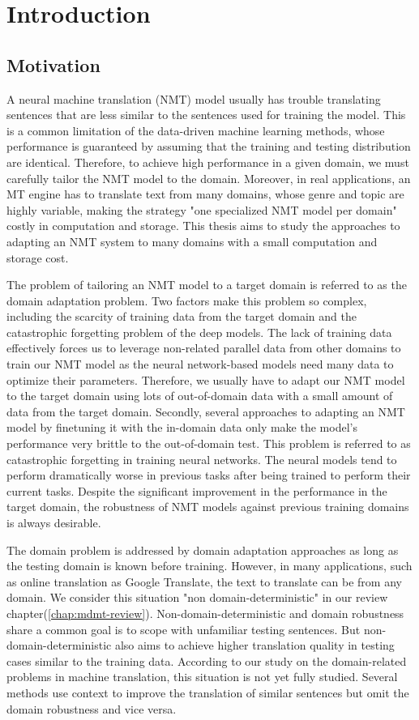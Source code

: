 \chapter{Introduction}
\section{Motivation}
A neural machine translation (NMT) model usually has trouble translating sentences that are less similar to the sentences used for training the model. This is a common limitation of the data-driven machine learning methods, whose performance is guaranteed by assuming that the training and testing distribution are identical. Therefore, to achieve high performance in a given domain, we must carefully tailor the NMT model to the domain. Moreover, in real applications, an MT engine has to translate text from many domains, whose genre and topic are highly variable, making the strategy "one specialized NMT model per domain" costly in computation and storage. This thesis aims to study the approaches to adapting an NMT system to many domains with a small computation and storage cost.

The problem of tailoring an NMT model to a target domain is referred to as the domain adaptation problem. Two factors make this problem so complex, including the scarcity of training data from the target domain and the catastrophic forgetting problem of the deep models. The lack of training data effectively forces us to leverage non-related parallel data from other domains to train our NMT model as the neural network-based models need many data to optimize their parameters. Therefore, we usually have to adapt our NMT model to the target domain using lots of out-of-domain data with a small amount of data from the target domain. Secondly, several approaches to adapting an NMT model by finetuning it with the in-domain data only make the model's performance very brittle to the out-of-domain test. This problem is referred to as catastrophic forgetting in training neural networks. The neural models tend to perform dramatically worse in previous tasks after being trained to perform their current tasks. Despite the significant improvement in the performance in the target domain, the robustness of NMT models against previous training domains is always desirable.

The domain problem is addressed by domain adaptation approaches as long as the testing domain is known before training. However, in many applications, such as online translation as Google Translate, the text to translate can be from any domain. We consider this situation "non domain-deterministic" in our review chapter(\ref{chap:mdmt-review}). Non-domain-deterministic and domain robustness share a common goal is to scope with unfamiliar testing sentences. But non-domain-deterministic also aims to achieve higher translation quality in testing cases similar to the training data. According to our study on the domain-related problems in machine translation, this situation is not yet fully studied. Several methods use context to improve the translation of similar sentences but omit the domain robustness and vice versa.
